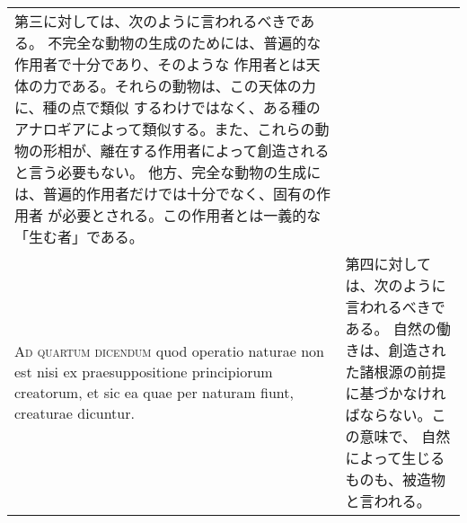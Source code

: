 \documentclass[10pt]{jsarticle} %
\begin{document}
\begin{longtable}{p{21em}p{21em}}
第三に対しては、次のように言われるべきである。
不完全な動物の生成のためには、普遍的な作用者で十分であり、そのような
 作用者とは天体の力である。それらの動物は、この天体の力に、種の点で類似
 するわけではなく、ある種のアナロギアによって類似する。また、これらの動
 物の形相が、離在する作用者によって創造されると言う必要もない。
他方、完全な動物の生成には、普遍的作用者だけでは十分でなく、固有の作用者
 が必要とされる。この作用者とは一義的な「生む者」である。

\\


{\scshape Ad quartum dicendum} quod operatio naturae non
est nisi ex praesuppositione principiorum creatorum, et sic ea quae per
naturam fiunt, creaturae dicuntur.

&

第四に対しては、次のように言われるべきである。
自然の働きは、創造された諸根源の前提に基づかなければならない。この意味で、
 自然によって生じるものも、被造物と言われる。


\end{longtable}
\end{document}
